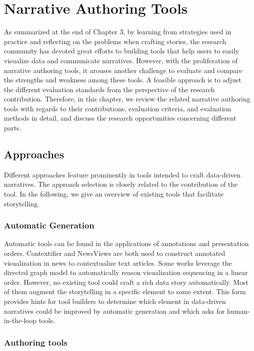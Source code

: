 \chapter{Narrative Authoring Tools}\label{sec-tool}

As summarized at the end of Chapter 3, by learning from strategies used in practice and reflecting on the problems when crafting stories, the research community has devoted great efforts to building tools that help users to easily visualize data and communicate narratives. However, with the proliferation of narrative authoring tools, it arouses another challenge to evaluate and compare the strengths and weakness among these tools. A feasible approach is to adjust the different evaluation standards from the perspective of the research contribution. Therefore, in this chapter, we review the related narrative authoring tools with regards to their contributions, evaluation criteria, and evaluation methods in detail, and discuss the research opportunities concerning different parts.

\section{Approaches}

Different approaches feature prominently in tools intended to craft data-driven narratives. The approach selection is closely related to the contribution of the tool. In the following, we give an overview of existing tools that facilitate storytelling.

\subsection{Automatic Generation}
Automatic tools can be found in the applications of annotations and presentation orders. Contextifier \cite{Hullman2013} and NewsViews \cite{Gao2014} are both used to construct annotated visualization in news to contextualize text articles. Some works \cite{Hullman2013a, Kim2017a} leverage the directed graph model to automatically reason visualization sequencing in a linear order. However, no existing tool could craft a rich data story automatically. Most of them augment the storytelling in a specific element to some extent. This form provides hints for tool builders to determine which element in data-driven narratives could be improved by automatic generation and which asks for human-in-the-loop tools. 

\subsection{Authoring tools}

